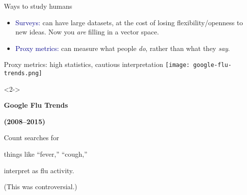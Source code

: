 \documentclass[aspectratio=169]{beamer}
\begin{document}
\begin{frame}{Ways to study humans}
\begin{itemize}
\vspace{0.05 cm}
\begin{itemize}\large\setlength{\itemsep}{0.15 cm}
\item \textcolor{darkblue}{Surveys:} \normalsize can have large datasets, at the cost of losing flexibility/openness to new ideas. Now you {\it are} filling in a vector space. \large

\item \textcolor{darkblue}{Proxy metrics:} \normalsize can measure what people {\it do}, rather than what they {\it say}. \large
\end{itemize}

\end{itemize}
\end{frame}

\begin{frame}{Proxy metrics: high statistics, cautious interpretation}
\vspace{0.25 cm}
\mbox{\hspace{0.75 cm}\texttt{[image: google-flu-trends.png]}}

\begin{uncoverenv}<2->
\vspace{-3.35 cm}
\hspace{-0.25 cm}\begin{minipage}{0.3\linewidth}
{\bf Google Flu Trends}

{\bf (2008--2015)}

\small
\vspace{0.25 cm}
Count searches for

things like ``fever,'' ``cough,''

interpret as flu activity.

\vspace{0.25 cm}
(This was controversial.)
\end{minipage}
\vspace{3.35 cm}
\end{uncoverenv}
\end{frame}
\end{document}
